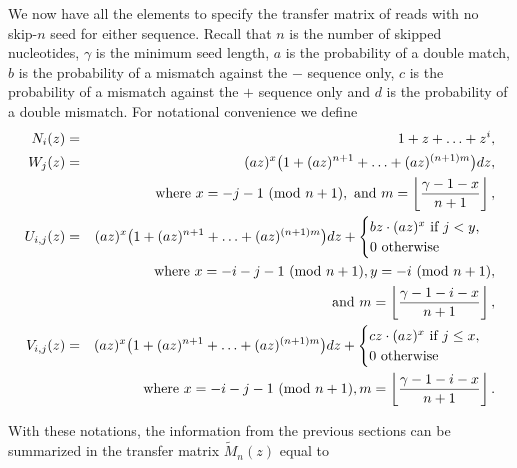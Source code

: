 \documentclass{article}
\newcommand{\modulo}[1]{\ (\mathrm{mod}\ #1)}
\begin{document}
We now have all the elements to specify the transfer matrix of reads with
no skip-$n$ seed for either sequence. Recall that $n$ is the number of
skipped nucleotides, $\gamma$ is the minimum seed length, $a$ is the
probability of a double match, $b$ is the probability of a mismatch
against the $-$ sequence only, $c$ is the probability of a mismatch
against the $+$ sequence only and $d$ is the probability of a double
mismatch. For notational convenience we define
\begin{eqnarray}
\label{eq_N}
N_i(z) &=& 1+z+\ldots+z^i, \\
W_j(z) &=& (az)^x \big( 1 + (az)^{n+1} + \ldots +
  (az)^{(n+1)m} \big) dz, \\
  \notag
  &\quad& \text{where } x = -j-1 \modulo{n+1},
  \text{ and } m = \left\lfloor
  \frac{\gamma-1-x}{n+1} \right\rfloor, \\
U_{i,j}(z) &=& (az)^x
  \big( 1 + (az)^{n+1} + \ldots + (az)^{(n+1)m} \big)dz +
\begin{cases}
  bz\cdot(az)^x \text{ if } j < y, \\
  0 \text{ otherwise}
\end{cases} \\
  \notag
  &\quad& \text{where } x = -i-j-1 \modulo{n+1},
  y = -i \modulo{n+1}, \\
  \notag
  &\quad& \text{and } m = \left\lfloor \frac{\gamma-1-i-x}{n+1}
    \right\rfloor, \\
V_{i,j}(z) &=& (az)^x 
  \big( 1 + (az)^{n+1} + \ldots + (az)^{(n+1)m} \big)dz +
\begin{cases}
  cz\cdot(az)^x \text{ if } j \leq x, \\
  0 \text{ otherwise}
\end{cases} \\
  \notag
  &\quad& \text{ where } x = -i-j-1 \modulo{n+1},
  m = \left\lfloor \frac{\gamma-1-i-x}{n+1} \right\rfloor.
\end{eqnarray}

With these notations, the information from the previous sections can be
summarized in the transfer matrix $\tilde{M}_n(z)$ equal to

\pagebreak
\end{document}
